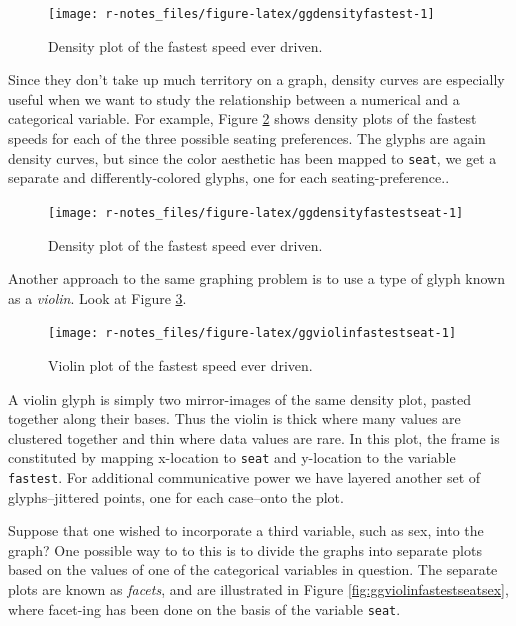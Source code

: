 \documentclass[]{book}
\theoremstyle{definition}
\theoremstyle{definition}
\theoremstyle{definition}
\theoremstyle{remark}
\begin{document}
{\begin{figure}

{\centering \texttt{[image: r-notes\_files/figure-latex/ggdensityfastest-1]} 

}

\caption{Density plot of the fastest speed ever driven.}\label{fig:ggdensityfastest}
\end{figure}

Since they don't take up much territory on a graph, density curves are
especially useful when we want to study the relationship between a
numerical and a categorical variable. For example, Figure
\ref{fig:ggdensityfastestseat} shows density plots of the fastest speeds
for each of the three possible seating preferences. The glyphs are again
density curves, but since the color aesthetic has been mapped to
\texttt{seat}, we get a separate and differently-colored glyphs, one for
each seating-preference..

\begin{figure}

{\centering \texttt{[image: r-notes\_files/figure-latex/ggdensityfastestseat-1]} 

}

\caption{Density plot of the fastest speed ever driven.}\label{fig:ggdensityfastestseat}
\end{figure}

Another approach to the same graphing problem is to use a type of glyph
known as a \emph{violin}. Look at Figure \ref{fig:ggviolinfastestseat}.

\begin{figure}

{\centering \texttt{[image: r-notes\_files/figure-latex/ggviolinfastestseat-1]} 

}

\caption{Violin plot of the fastest speed ever driven.}\label{fig:ggviolinfastestseat}
\end{figure}

A violin glyph is simply two mirror-images of the same density plot,
pasted together along their bases. Thus the violin is thick where many
values are clustered together and thin where data values are rare. In
this plot, the frame is constituted by mapping x-location to
\texttt{seat} and y-location to the variable \texttt{fastest}. For
additional communicative power we have layered another set of
glyphs--jittered points, one for each case--onto the plot.

Suppose that one wished to incorporate a third variable, such as sex,
into the graph? One possible way to to this is to divide the graphs into
separate plots based on the values of one of the categorical variables
in question. The separate plots are known as \emph{facets},
 and are illustrated in Figure
\ref{fig:ggviolinfastestseatsex}, where facet-ing has been done on the
basis of the variable \texttt{seat}.

}
\end{document}
